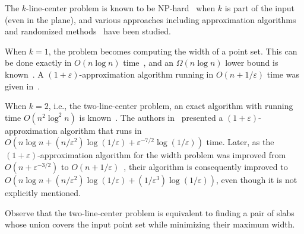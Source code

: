 \documentclass[10pt,a4paper]{article}
\theoremstyle{star}
\theoremstyle{claimstar}
\newcommand{\eps}{\ensuremath{\varepsilon}}
\begin{document}
The $k$-line-center problem is known to be NP-hard~\cite{Megiddo1982pc_npcomplete} when $k$ is part of the input (even in the plane), 
and various approaches including approximation algorithms and randomized methods~\cite{  pc_apx_dklogk, agarwal2005approximation, pc_shapefitting_cylinder,pc_shapefitting_box, chan2006faster,  pc_greedy_number_apx, pc_fixedkq,HASSIN199129_pc_hitting, pc_montecarlo} have been studied.  


When $k=1$, the problem becomes computing the width of a point set.  
This can be done exactly in $O(n\log n)$ time~\cite{Shamos:1978:CG:width}, and an $\Omega(n\log n)$ lower bound is known~\cite{lee1986geometric}.  
A $(1+\eps)$-approximation algorithm running in $O(n + 1/\eps)$ time was given in~\cite{chan2006faster}.

When $k=2$, i.e., the two-line-center problem, an exact algorithm with running time $O(n^2\log^2 n)$ is known~\cite{jaromczyk1995}.  
The authors in~\cite{agarwalTwo} presented a $(1+\eps)$-approximation algorithm that runs in  
$O(n\log n + (n/\eps^2)\log(1/\eps) + \eps^{-7/2}\log(1/\eps))$ time.  
Later, as the $(1+\eps)$-approximation algorithm for the width problem was improved from  
$O(n + \eps^{-3/2})$ to $O(n + 1/\eps)$~\cite{chan2006faster},  
their algorithm is consequently improved to $O(n\log n + ({n}/{\eps^2}) \log ({1}/{\eps}) + (1/\eps^3)\log ({1}/{\eps}))$, even though it is not explicitly mentioned. 


Observe that the two-line-center problem is equivalent to finding a pair of slabs whose union covers the input point set while minimizing their maximum width. 
\end{document}
